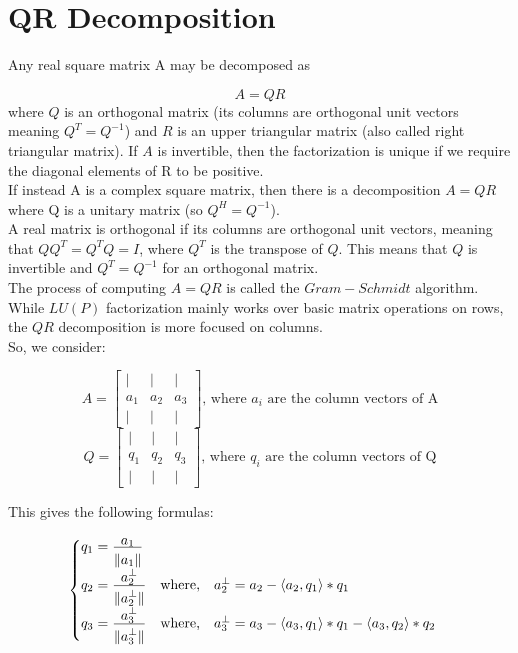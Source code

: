 \section{QR Decomposition}

Any real square matrix A may be decomposed as

$$
A = QR
$$
where $Q$ is an orthogonal matrix (its columns are orthogonal unit vectors meaning $Q^{T}=Q^{-1}$) and $R$ is an upper triangular matrix (also called right triangular matrix). If $A$ is invertible, then the factorization is unique if we require the diagonal elements of R to be positive.
\\

If instead A is a complex square matrix, then there is a decomposition $A = QR$ where Q is a unitary matrix (so $Q^{H}=Q^{-1}$).
\\

A real matrix is orthogonal if its columns are orthogonal unit vectors, meaning that $QQ^T = Q^TQ = I$, where $Q^T$ is the transpose of $Q$. This means that $Q$ is invertible and $Q^T = Q^{-1}$ for an orthogonal matrix.
\\

The process of computing $A=QR$ is called the $Gram-Schmidt$ algorithm.
\\

While $LU(P)$ factorization mainly works over basic matrix operations on rows, the $QR$ decomposition is more focused on columns.
\\

So, we consider:

$$
A = 
\begin{bmatrix}
| & | & | \\
a_{1} & a_{2} & a_{3} \\
| & | & |
\end{bmatrix}
\text{, \ where } a_{i} \text{ are the column vectors of A}
$$
$$
Q = 
\begin{bmatrix}
| & | & | \\
q_{1} & q_{2} & q_{3} \\
| & | & |
\end{bmatrix}
\text{, \ where } q_{i} \text{ are the column vectors of Q}
$$

This gives the following formulas:

$$
\begin{cases}
q_{1} = \frac{\displaystyle a_{1}}{\displaystyle \rule{0mm}{4mm} \lVert a_{1} \rVert} \\[3mm]
q_{2} = \frac{\displaystyle a^{\bot}_{2}}{\displaystyle \rule{0mm}{4mm}\lVert a^{\bot}_{2} \rVert} \text{\quad where,\quad } a^{\bot}_{2} = a_{2} - \langle a_{2}, q_{1} \rangle * q_{1} \\[3mm]
q_{3} = \frac{\displaystyle a^{\bot}_{3}}{\displaystyle \rule{0mm}{4mm}\lVert a^{\bot}_{3} \rVert} \text{\quad where,\quad } a^{\bot}_{3} = a_{3} - \langle a_{3}, q_{1} \rangle * q_{1} - \langle a_{3}, q_{2} \rangle * q_{2}
\end{cases}
$$

